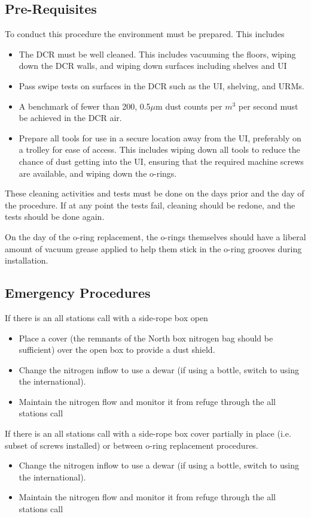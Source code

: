 \documentclass[11pt]{article}
\begin{document}
\subsection{Pre-Requisites}
To conduct this procedure the environment must be prepared. This includes
	\begin{itemize}
	\item The DCR must be well cleaned. This includes vacuuming the floors, wiping down the DCR walls, and wiping down surfaces including shelves and UI
	\item Pass swipe tests on surfaces in the DCR such as the UI, shelving, and URMs.
	\item A benchmark of fewer than 200, 0.5$\mu$m dust counts per $m^{3}$ per second must be achieved in the DCR air.
	\item Prepare all tools for use in a secure location away from the UI, preferably on a trolley for ease of access. This includes wiping down all tools to reduce the chance of dust getting into the UI, ensuring that the required machine screws are available, and wiping down the o-rings.
	\end{itemize}
These cleaning activities and tests must be done on the days prior and the day of the procedure. If at any point the tests fail, cleaning should be redone, and the tests should be done again. 

On the day of the o-ring replacement, the o-rings themselves should have a liberal amount of vacuum grease applied to help them stick in the o-ring grooves during installation.

\subsection{Emergency Procedures}

If there is an all stations call with a side-rope box open
\begin{itemize}
\item Place a cover (the remnants of the North box nitrogen bag should be sufficient) over the open box to provide a dust shield.
\item Change the nitrogen inflow to use a dewar (if using a bottle, switch to using the international). 
\item Maintain the nitrogen flow and monitor it from refuge through the all stations call
\end{itemize}

If there is an all stations call with a side-rope box cover partially in place (i.e. subset of screws installed) or between o-ring replacement procedures. 
\begin{itemize}
\item Change the nitrogen inflow to use a dewar (if using a bottle, switch to using the international). 
\item Maintain the nitrogen flow and monitor it from refuge through the all stations call
\end{itemize}
\end{document}
